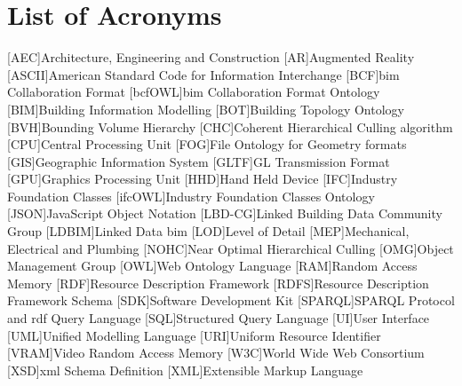 \documentclass[12pt,a4paper,faculty=ea,language=en,doctype=report]{ugent-doc}
\renewcommand{\ULthickness}{2pt} %
\begin{document}
\maketitle
\renewcommand{\ULthickness}{1pt}
\normalem
{\hypersetup{hidelinks}
  \tableofcontents
  \listoffigures
  \let\clearpage\relax
  \listoftables
}

\newpage









% 
\clearpage
\chapter*{List of Acronyms}
\begin{acronym}[JSONP]\itemsep2pt\hypersetup{hidelinks}
  [AEC]{Architecture, Engineering and Construction}  
  [AR]{Augmented Reality}
  [ASCII]{American Standard Code for Information Interchange}
  [BCF]{\acs{bim} Collaboration Format}
  [bcfOWL]{\acs{bim} Collaboration Format Ontology}
  [BIM]{Building Information Modelling}
  [BOT]{Building Topology Ontology}
  [BVH]{Bounding Volume Hierarchy}
  [CHC]{Coherent Hierarchical Culling algorithm}
  [CPU]{Central Processing Unit}
  [FOG]{File Ontology for Geometry formats}
  [GIS]{Geographic Information System}
  [GLTF]{GL Transmission Format}
  [GPU]{Graphics Processing Unit}
  [HHD]{Hand Held Device}
  [IFC]{Industry Foundation Classes}
  [ifcOWL]{Industry Foundation Classes Ontology}
  [JSON]{JavaScript Object Notation}
  [LBD-CG]{Linked Building Data Community Group}
  [LDBIM]{Linked Data \acs{bim}}
  [LOD]{Level of Detail}
  [MEP]{Mechanical, Electrical and Plumbing}
  [NOHC]{Near Optimal Hierarchical Culling}
  [OMG]{Object Management Group}
  [OWL]{Web Ontology Language}
  [RAM]{Random Access Memory}
  [RDF]{Resource Description Framework}
  [RDFS]{Resource Description Framework Schema}
  [SDK]{Software Development Kit}
  [SPARQL]{SPARQL Protocol and \acs{rdf} Query Language}
  [SQL]{Structured Query Language}
  [UI]{User Interface}
  [UML]{Unified Modelling Language}
  [URI]{Uniform Resource Identifier}
  [VRAM]{Video Random Access Memory}
  [W3C]{World Wide Web Consortium}
  [XSD]{\ac{xml} Schema Definition}
  [XML]{Extensible Markup Language}
\end{acronym}

\printbibliography[nottype=web_page, heading=bibintoc,title={References}]
\printbibliography[type=web_page, heading=bibintoc, title={Referenced webistes}]
\end{document}
